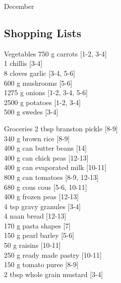 \begin{menu}{December}
    \subsection*{Shopping Lists}
      \begin{shoppinglist}{Vegetables}
      750 g carrots {\scriptsize[1-2, 3-4]}\\
      1  chillis {\scriptsize[3-4]}\\
      8 cloves garlic {\scriptsize[3-4, 5-6]}\\
      600 g mushrooms {\scriptsize[5-6]}\\
      1275 g onions {\scriptsize[1-2, 3-4, 5-6]}\\
      2500 g potatoes {\scriptsize[1-2, 3-4]}\\
      500 g swedes {\scriptsize[3-4]}\\
      \end{shoppinglist}%
      \begin{shoppinglist}{Groceries}
      2 tbsp branston pickle {\scriptsize[8-9]}\\
      340 g brown rice {\scriptsize[8-9]}\\
      400 g can butter beans {\scriptsize[14]}\\
      400 g can chick peas {\scriptsize[12-13]}\\
      400 g can evaporated milk {\scriptsize[10-11]}\\
      800 g can tomatoes {\scriptsize[8-9, 12-13]}\\
      680 g cous cous {\scriptsize[5-6, 10-11]}\\
      400 g frozen peas {\scriptsize[12-13]}\\
      4 tsp gravy granules {\scriptsize[3-4]}\\
      4  naan bread {\scriptsize[12-13]}\\
      170 g pasta shapes {\scriptsize[7]}\\
      150 g pearl barley {\scriptsize[5-6]}\\
      50 g raisins {\scriptsize[10-11]}\\
      250 g ready made pastry {\scriptsize[10-11]}\\
      150 g tomato puree {\scriptsize[8-9]}\\
      2 tbsp whole grain mustard {\scriptsize[3-4]}\\
      \end{shoppinglist}%
      \par\vfil %

\end{menu}
